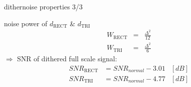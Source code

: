 	\begin{frame}{dither}{noise properties 3/3}
		
            
            noise power of $d_\mathrm{RECT}$ \& $d_\mathrm{TRI}$
            \begin{eqnarray*}
                W_\mathrm{RECT} &=& \frac{\Delta^2}{12}\\
                W_\mathrm{TRI} &=& \frac{\Delta^2}{6}
            \end{eqnarray*}
		\pause
		\bigskip
        $\Rightarrow$ SNR of dithered full scale signal:
		\begin{eqnarray*}
			SNR_\mathrm{RECT} 	&= SNR_{normal} - 3.01 &[dB] \\
			SNR_\mathrm{TRI} 	&= SNR_{normal} - 4.77 &[dB] 
		\end{eqnarray*}

	\end{frame}	
